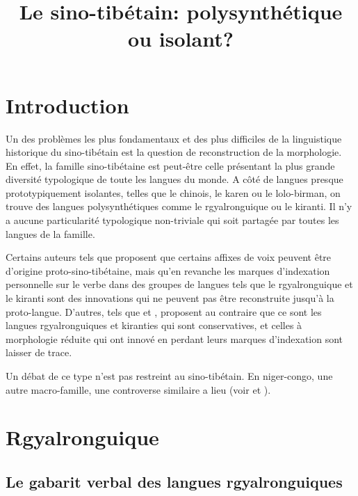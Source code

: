 \documentclass[oldfontcommands,oneside,a4paper,11pt]{article}
\begin{document}
 
\title{Le sino-tibétain: polysynthétique ou isolant?  }
\maketitle
\linenumbers

\section{Introduction}
Un des problèmes les plus fondamentaux et des plus difficiles de la linguistique historique du sino-tibétain est la question de reconstruction de la morphologie. En effet, la famille sino-tibétaine est peut-être celle présentant la plus grande diversité typologique de toute les langues du monde. A côté de langues presque prototypiquement isolantes, telles que le chinois, le karen ou le lolo-birman, on trouve des langues polysynthétiques comme le rgyalronguique ou le kiranti. Il n'y a aucune particularité typologique non-triviale qui soit partagée par toutes les langues de la famille. 

Certains auteurs tels que  \citet{lapolla03} proposent que certains affixes de voix peuvent être d'origine proto-sino-tibétaine, mais qu'en revanche les marques d'indexation personnelle sur le verbe dans des groupes de langues tels que le rgyalronguique et le kiranti sont des innovations qui ne peuvent pas être reconstruite jusqu'à la proto-langue. D'autres, tels que  \citet{driem93agreement}  et \citet{delancey10agreement}, proposent au contraire que ce sont les langues rgyalronguiques et kiranties qui sont conservatives, et celles à morphologie réduite qui ont innové en perdant leurs marques d'indexation sont laisser de trace.


Un débat de ce type n'est pas restreint au sino-tibétain. En niger-congo, une autre macro-famille, une controverse similaire a lieu (voir  \citealt{guldeman08macrosudan} et  \citealt{hyman11macrosudan}). 

\section{Rgyalronguique}

\subsection{Le gabarit verbal des langues rgyalronguiques}

\citealt{jacques12agreement}
\end{document}
